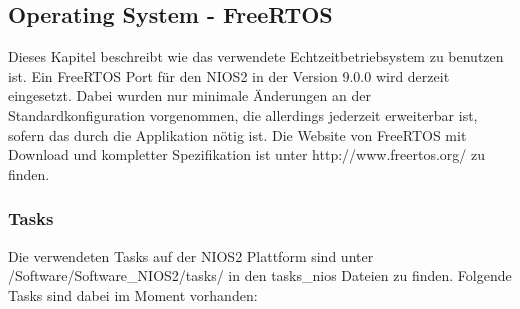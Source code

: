  \subsection{Operating System - FreeRTOS}
 Dieses Kapitel beschreibt wie das verwendete Echtzeitbetriebsystem zu benutzen ist. Ein FreeRTOS Port für den NIOS2 in der Version 9.0.0 wird derzeit eingesetzt. Dabei wurden nur minimale Änderungen an der Standardkonfiguration vorgenommen, die allerdings jederzeit erweiterbar ist, sofern das durch die Applikation nötig ist. Die Website von FreeRTOS mit Download und kompletter Spezifikation ist unter http://www.freertos.org/ zu finden.
 \subsubsection{Tasks}
 Die verwendeten Tasks auf der NIOS2 Plattform sind unter /Software/Software\_NIOS2/tasks/ in den tasks\_nios Dateien zu finden. Folgende Tasks sind dabei im Moment vorhanden:
